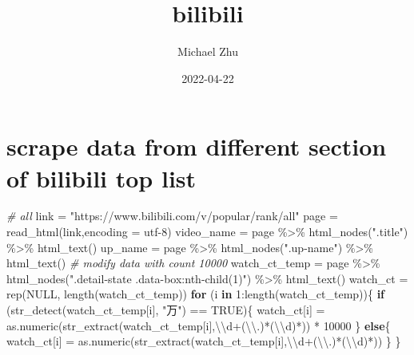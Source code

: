 \documentclass[
]{article}
\title{bilibili}
\author{Michael Zhu}
\date{2022-04-22}
\newenvironment{Shaded}{\begin{snugshade}}{\end{snugshade}}
\newcommand{\AttributeTok}[1]{\textcolor[rgb]{0.77,0.63,0.00}{#1}}
\newcommand{\CommentTok}[1]{\textcolor[rgb]{0.56,0.35,0.01}{\textit{#1}}}
\newcommand{\ConstantTok}[1]{\textcolor[rgb]{0.00,0.00,0.00}{#1}}
\newcommand{\ControlFlowTok}[1]{\textcolor[rgb]{0.13,0.29,0.53}{\textbf{#1}}}
\newcommand{\DecValTok}[1]{\textcolor[rgb]{0.00,0.00,0.81}{#1}}
\newcommand{\FunctionTok}[1]{\textcolor[rgb]{0.00,0.00,0.00}{#1}}
\newcommand{\NormalTok}[1]{#1}
\newcommand{\OtherTok}[1]{\textcolor[rgb]{0.56,0.35,0.01}{#1}}
\newcommand{\SpecialCharTok}[1]{\textcolor[rgb]{0.00,0.00,0.00}{#1}}
\newcommand{\StringTok}[1]{\textcolor[rgb]{0.31,0.60,0.02}{#1}}
\begin{document}
\maketitle

\hypertarget{scrape-data-from-different-section-of-bilibili-top-list}{%
\section{scrape data from different section of bilibili top
list}\label{scrape-data-from-different-section-of-bilibili-top-list}}

\begin{Shaded}
\begin{Highlighting}[]
\CommentTok{\# all}
\NormalTok{link }\OtherTok{=} \StringTok{"https://www.bilibili.com/v/popular/rank/all"}
\NormalTok{page }\OtherTok{=} \FunctionTok{read\_html}\NormalTok{(link,}\AttributeTok{encoding =} \StringTok{\textquotesingle{}utf{-}8\textquotesingle{}}\NormalTok{)}
\NormalTok{video\_name }\OtherTok{=}\NormalTok{ page }\SpecialCharTok{\%\textgreater{}\%} \FunctionTok{html\_nodes}\NormalTok{(}\StringTok{".title"}\NormalTok{) }\SpecialCharTok{\%\textgreater{}\%} \FunctionTok{html\_text}\NormalTok{()}
\NormalTok{up\_name }\OtherTok{=}\NormalTok{ page }\SpecialCharTok{\%\textgreater{}\%} \FunctionTok{html\_nodes}\NormalTok{(}\StringTok{".up{-}name"}\NormalTok{) }\SpecialCharTok{\%\textgreater{}\%} \FunctionTok{html\_text}\NormalTok{()}
\CommentTok{\# modify data with count 10000}
\NormalTok{watch\_ct\_temp }\OtherTok{=}\NormalTok{ page }\SpecialCharTok{\%\textgreater{}\%} \FunctionTok{html\_nodes}\NormalTok{(}\StringTok{".detail{-}state .data{-}box:nth{-}child(1)"}\NormalTok{) }\SpecialCharTok{\%\textgreater{}\%} \FunctionTok{html\_text}\NormalTok{()}
\NormalTok{watch\_ct }\OtherTok{=} \FunctionTok{rep}\NormalTok{(}\ConstantTok{NULL}\NormalTok{, }\FunctionTok{length}\NormalTok{(watch\_ct\_temp))}
\ControlFlowTok{for}\NormalTok{ (i }\ControlFlowTok{in} \DecValTok{1}\SpecialCharTok{:}\FunctionTok{length}\NormalTok{(watch\_ct\_temp))\{}
  \ControlFlowTok{if}\NormalTok{ (}\FunctionTok{str\_detect}\NormalTok{(watch\_ct\_temp[i], }\StringTok{"万"}\NormalTok{) }\SpecialCharTok{==} \ConstantTok{TRUE}\NormalTok{)\{}
\NormalTok{    watch\_ct[i] }\OtherTok{=} \FunctionTok{as.numeric}\NormalTok{(}\FunctionTok{str\_extract}\NormalTok{(watch\_ct\_temp[i],}\StringTok{\textquotesingle{}}\SpecialCharTok{\textbackslash{}\textbackslash{}}\StringTok{d+(}\SpecialCharTok{\textbackslash{}\textbackslash{}}\StringTok{.)*(}\SpecialCharTok{\textbackslash{}\textbackslash{}}\StringTok{d)*\textquotesingle{}}\NormalTok{)) }\SpecialCharTok{*} \DecValTok{10000}
\NormalTok{  \}}
  \ControlFlowTok{else}\NormalTok{\{}
\NormalTok{    watch\_ct[i] }\OtherTok{=} \FunctionTok{as.numeric}\NormalTok{(}\FunctionTok{str\_extract}\NormalTok{(watch\_ct\_temp[i],}\StringTok{\textquotesingle{}}\SpecialCharTok{\textbackslash{}\textbackslash{}}\StringTok{d+(}\SpecialCharTok{\textbackslash{}\textbackslash{}}\StringTok{.)*(}\SpecialCharTok{\textbackslash{}\textbackslash{}}\StringTok{d)*\textquotesingle{}}\NormalTok{))}
\NormalTok{  \}}
\NormalTok{\}}


\end{Highlighting}
\end{Shaded}
\end{document}
